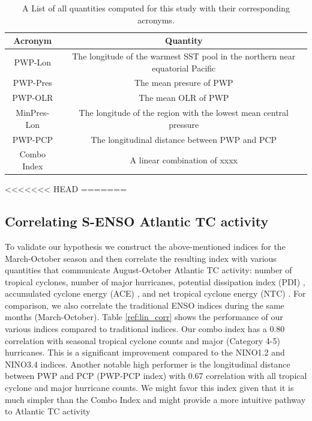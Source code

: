 \documentclass[]{article}
\begin{document}
\begin{table}
\begin{tabular}{cc}
\hline
Acronym & Quantity\\
\hline
PWP-Lon & The longitude of the warmest SST pool in the northern near equatorial Pacific\\
PWP-Pres & The mean presure of PWP\\
PWP-OLR &  The mean OLR of PWP \\
MinPres-Lon & The longitude of the region with the lowest mean central pressure\\
PWP-PCP & The longitudinal distance between PWP and PCP \\
Combo Index & A linear combination of xxxx \\
\hline
\end{tabular}
\caption{A List of all quantities computed for this study with their corresponding acronyms.}
\label{ref:acronyms}
\end{table}

<<<<<<< HEAD
=======
\subsection{Correlating S-ENSO Atlantic TC activity}
To validate our hypothesis we construct the above-mentioned indices for the March-October season and then correlate the resulting index with various quantities that communicate August-October Atlantic TC activity: number of tropical cyclones, number of major hurricanes, potential dissipation index (PDI) \cite{emanuel2005a}, accumulated cyclone energy (ACE) \cite{Bell2000}, and net tropical cyclone energy (NTC) \cite{goldenberg2001}. For comparison, we also correlate the traditional ENSO indices during the same months (March-October). Table \ref{ref:lin_corr} shows the performance of our various indices compared to traditional indices. Our combo index has a 0.80 correlation with seasonal tropical cyclone counts and major (Category 4-5) hurricanes. This is a significant improvement compared to the NINO1.2 and NINO3.4 indices. Another notable high performer is the longitudinal distance between PWP and PCP (PWP-PCP index) with 0.67 correlation with all tropical cyclone and major hurricane counts. We might favor this index given that it is much simpler than the Combo Index and might provide a more intuitive pathway to Atlantic TC activity
\end{document}
